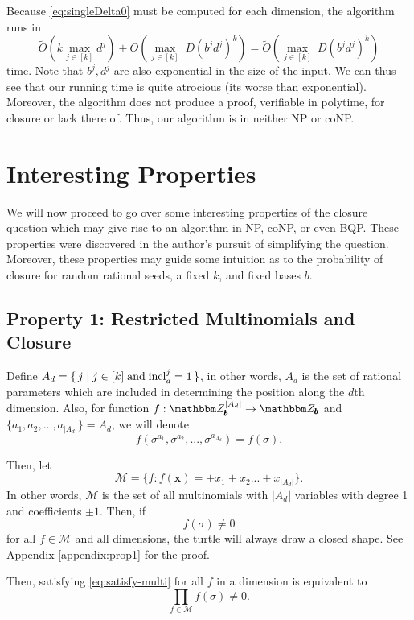 \documentclass[11pt,titlepage]{article}
\newcommand{\inclIndic}[2]{{\mathrm{incl}_{#1}^{#2}}}
\newcommand{\commonBase}{{\pmb{b}}}
\newcommand{\digSumPeriodicNoJ}{{\sigma}}
\begin{document}
Because \eqref{eq:singleDelta0} must be computed for each dimension, the algorithm
runs in 
$$
  \widetilde{O}\left(k \max_{j \in [k]} d^j \right) + 
  O\left(\max_{j \in [k]} \; D (b^j d^j)^k \right) = 
  \widetilde{O}\left(\max_{j \in [k]} \; D (b^j d^j)^k \right)
$$
time.
Note that $b^j, d^j$ are also exponential in the size of the input. 
We can thus see that our running time is quite atrocious (its worse than exponential).
Moreover, the algorithm does not produce a proof, verifiable in polytime, for closure 
or lack there of. Thus, our algorithm is in neither NP or coNP.

\section{Interesting Properties}
We will now proceed to go over some interesting properties of the closure question
which may give rise to an algorithm in NP, coNP, or even BQP. These properties were discovered
in the author's pursuit of simplifying the question. Moreover, these properties may guide
some intuition as to the probability of closure for random rational seeds, a fixed $k$, 
and fixed bases $b$.

\subsection{Property 1: Restricted Multinomials and Closure}
\label{prop:1}
Define $A_d = \set{j \mid j \in [k] \; \text{and}\; \inclIndic{d}{j} = 1}$, in other words,
$A_d$ is the set of rational parameters which are included in determining the position along the $d$th dimension.
Also, for function $f: \Z_\commonBase^{|A_d|} \rightarrow \Z_\commonBase$ and $\{a_1, a_2, ..., a_{|A_d|} \} = A_d$, we will denote
$$
  f\left(\digSumPeriodicNoJ^{a_1}, \digSumPeriodicNoJ^{a_2}, ..., \digSumPeriodicNoJ^{a_{A_d}}\right)
  = f\left(\digSumPeriodicNoJ\right).
$$

Then, let
$$
\mathcal{M} = \{f : f(\pmb{x}) = \pm x_1 \pm x_2 ... \pm x_{|A_d|}\}.
$$
In other words, $\mathcal{M}$ is the set of all multinomials with $|A_d|$ variables with
degree 1 and coefficients $\pm1$.
Then,
if \begin{equation}
\label{eq:satisfy-multi}
f\left(\digSumPeriodicNoJ\right) \neq 0
\end{equation}
for all $f \in \mathcal{M}$ and all dimensions, the turtle will always draw a closed shape. See 
Appendix \ref{appendix:prop1} for the proof.

Then, satisfying \eqref{eq:satisfy-multi} for all $f$ in a dimension is equivalent to
$$
  \prod_{f \in \mathcal{M}} f(\digSumPeriodicNoJ) \neq 0.
$$
\end{document}
